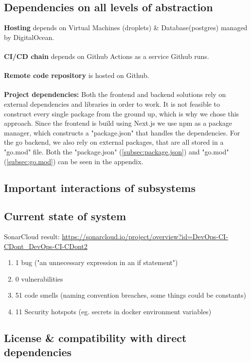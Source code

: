 \subsection{Dependencies on all levels of abstraction}
\textbf{Hosting} depends on Virtual Machines (droplets) \& Database(postgres) managed by DigitalOcean. 
\\\\
\textbf{CI/CD chain} depends on Github Actions as a service Github runs. 
\\\\
\textbf{Remote code repository} is hosted on Github.
\\\\
\textbf{Project dependencies:} Both the frontend and backend solutions rely on external dependencies and libraries in order to work. It is not feasible to construct every single package from the ground up, which is why we chose this approach. Since the frontend is build using Next.js we use npm as a package manager, which constructs a "package.json" that handles the dependencies. For the go backend, we also rely on external packages, that are all stored in a "go.mod" file. Both the "package.json" (\ref{subsec:package.json}) and "go.mod" (\ref{subsec:go.mod}) can be seen in the appendix.

\subsection{Important interactions of subsystems}
\subsection{Current state of system}
SonarCloud result: \url{https://sonarcloud.io/project/overview?id=DevOps-CI-CDont_DevOps-CI-CDont2}
\begin{enumerate}
    \item 1 bug ("an unnecessary expression in an if statement")
    \item 0 vulnerabilities
    \item 51 code smells (naming convention breaches, some things could be constants)
    \item 11 Security hotspots (eg. secrets in docker environment variables)
\end{enumerate}

\subsection{License \& compatibility with direct dependencies}

